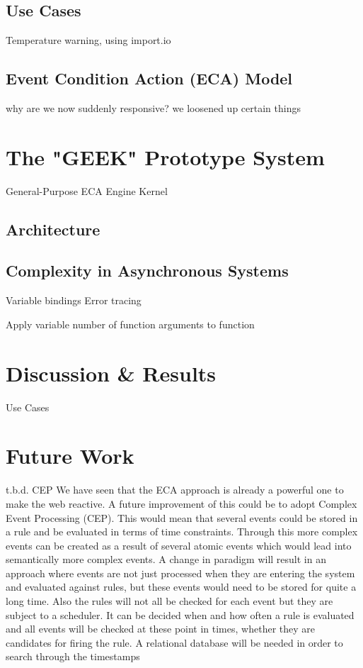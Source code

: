 \documentclass[11pt]{article}%
\begin{document}
\subsection{Use Cases}
Temperature warning, using import.io


\subsection{Event Condition Action (ECA) Model}
why are we now suddenly responsive? we loosened up certain things


\section{The "GEEK" Prototype System}

General-Purpose ECA Engine Kernel






\subsection{Architecture}


\subsection{Complexity in Asynchronous Systems}
Variable bindings
Error tracing

Apply variable number of function arguments to function



\section{Discussion \& Results}
Use Cases

\newpage


\section{Future Work}
t.b.d.
CEP
We have seen that the ECA approach is already a powerful one to make the web reactive.
A future improvement of this could be to adopt Complex Event Processing (CEP).
This would mean that several events could be stored in a rule and be evaluated in terms of time constraints.
Through this more complex events can be created as a result of several atomic events which would lead into semantically more complex events.
A change in paradigm will result in an approach where events are not just processed when they are entering the system and evaluated against rules, but these events would need to be stored for quite a long time.
Also the rules will not all be checked for each event but they are subject to a scheduler.
It can be decided when and how often a rule is evaluated and all events will be checked at these point in times, whether they are candidates for firing the rule.
A relational database will be needed in order to search through the timestamps
\end{document}
